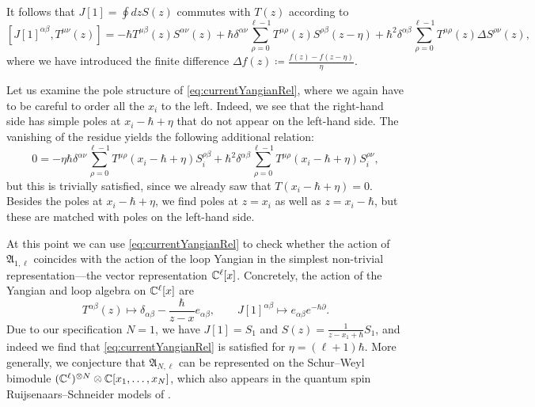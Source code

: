 \begin{corollary}
It follows that $J[1] = \oint dz S(z)$ commutes with $T(z)$ according to
\begin{equation}\label{eq:currentYangianRel}
[J[1]^{\alpha\beta},T^{\mu\nu}(z)] = -\hbar T^{\mu\beta}(z) S^{\alpha\nu}(z) + \hbar \delta^{\alpha\nu} \sum_{\rho=0}^{\ell-1} T^{\mu\rho}(z) S^{\rho\beta}(z-\eta) + \hbar^2 \delta^{\alpha\beta} \sum_{\rho=0}^{\ell-1} T^{\mu\rho}(z) \Delta S^{\rho\nu}(z),
\end{equation}
where we have introduced the finite difference $\Delta f(z) \coloneq \frac{f(z)-f(z-\eta)}{\eta}$.
\end{corollary}

\begin{remark}
Let us examine the pole structure of \eqref{eq:currentYangianRel}, where we again have to be careful to order all the $x_i$ to the left. Indeed, we see that the right-hand side has simple poles at $x_i-\hbar+\eta$ that do not appear on the left-hand side. The vanishing of the residue yields the following additional relation:
\begin{equation}
0 = -\eta\hbar \delta^{\alpha\nu} \sum_{\rho=0}^{\ell-1} T^{\mu\rho}(x_i-\hbar+\eta) S_i^{\rho\beta} + \hbar^2\delta^{\alpha\beta} \sum_{\rho=0}^{\ell-1} T^{\mu\rho}(x_i-\hbar+\eta) S_i^{\rho\nu},
\end{equation}
but this is trivially satisfied, since we already saw that $T(x_i-\hbar+\eta) = 0$. Besides the poles at $x_i-\hbar+\eta$, we find poles at $z=x_i$ as well as $z=x_i-\hbar$, but these are matched with poles on the left-hand side.
\end{remark}

At this point we can use \eqref{eq:currentYangianRel} to check whether the action of $\mathfrak{A}_{1,\ell}$ coincides with the action of the loop Yangian in the simplest non-trivial representation---the vector representation $\mathbb{C}^\ell[x]$. Concretely, the action of the Yangian and loop algebra on $\mathbb{C}^\ell[x]$ are
\begin{equation}
    T^{\alpha\beta}(z) \mapsto \delta_{\alpha\beta} - \frac{\hbar}{z-x} e_{\alpha\beta}, \qquad J[1]^{\alpha\beta} \mapsto e_{\alpha\beta} e^{-\hbar\partial}.
\end{equation}
Due to our specification $N=1$, we have $J[1] = S_1$ and $S(z) = \frac{1}{z-x_1+\hbar} S_1$, and indeed we find that \eqref{eq:currentYangianRel} is satisfied for $\eta = (\ell+1)\hbar$. More generally, we conjecture that $\mathfrak{A}_{N,\ell}$ can be represented on the Schur--Weyl bimodule $(\mathbb{C}^\ell)^{\otimes N} \otimes \mathbb{C}[x_1,\dots,x_N]$, which also appears in the quantum spin Ruijsenaars--Schneider models of \cite{klabbers_deformed_2024}.

